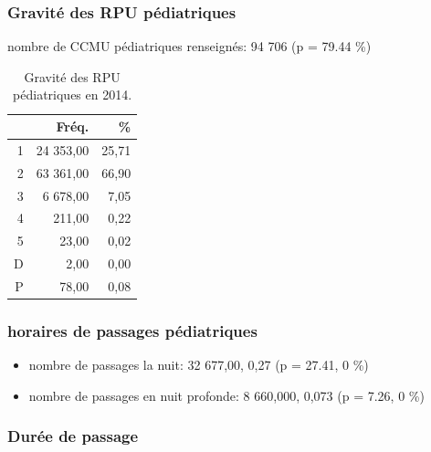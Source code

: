 \documentclass[]{article}
\begin{document}
\subsubsection{Gravité des RPU
pédiatriques}\label{gravite-des-rpu-pediatriques}

nombre de CCMU pédiatriques renseignés: 94 706 (p = 79.44 \%)

\begin{table}[ht]
\centering
\begin{tabular}{rrr}
  \hline
 & Fréq. & \% \\ 
  \hline
1 & 24 353,00 & 25,71 \\ 
  2 & 63 361,00 & 66,90 \\ 
  3 & 6 678,00 & 7,05 \\ 
  4 & 211,00 & 0,22 \\ 
  5 & 23,00 & 0,02 \\ 
  D & 2,00 & 0,00 \\ 
  P & 78,00 & 0,08 \\ 
   \hline
\end{tabular}
\caption{Gravité des RPU pédiatriques en 2014.} 
\end{table}

\subsubsection{horaires de passages
pédiatriques}\label{horaires-de-passages-pediatriques}

\begin{itemize}
\itemsep1pt\parskip0pt
\item
  nombre de passages la nuit: 32 677,00, 0,27 (p = 27.41, 0 \%)
\item
  nombre de passages en nuit profonde: 8 660,000, 0,073 (p = 7.26, 0 \%)
\end{itemize}

\subsubsection{Durée de passage}\label{duree-de-passage}
\end{document}
